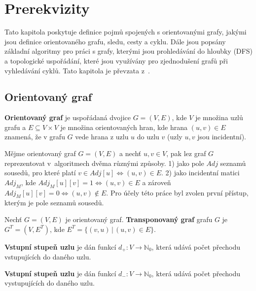 \chapter{Prerekvizity}
    \label{chapter:Intro}
    Tato kapitola poskytuje definice pojmů spojených s orientovanými grafy, jakými jsou definice orientovaného grafu, sledu, cesty a cyklu. Dále jsou popsány základní algoritmy pro práci s grafy, kterými jsou prohledávání do hloubky (DFS) a topologické uspořádání, které jsou využívány pro zjednodušení grafů při vyhledávání cyklů. Tato kapitola je převzata z~\cite{Prezentace}.

    \section{Orientovaný graf}
        \begin{definition}
            \textbf{Orientovaný graf} je uspořádaná dvojice $G = (V, E)$, kde $V$ je množina uzlů grafu a $E \subseteq V \times V$ je množina orientovaných hran, kde hrana $(u, v) \in E$ znamená, že v grafu $G$ vede hrana z uzlu $u$ do uzlu $v$ (uzly $u, v$ jsou incidentní).
        \end{definition}

        \vspace*{1em}
        Mějme orientovaný graf $G = (V, E)$ a nechť $u, v \in V$, pak lez graf $G$ reprezentovat v~algoritmech dvěma různými způsoby. 1) jako pole $Adj$ seznamů sousedů, pro které platí $v \in Adj[u] \iff (u, v) \in E$. 2) jako incidentní matici $Adj_M$, kde $Adj_M[u][v] = 1 \iff (u, v) \in E$ a zároveň  $Adj_M[u][v] = 0 \iff (u, v) \notin E$. Pro účely této práce byl zvolen první přístup, kterým je pole seznamů sousedů.

        \begin{definition}
            Nechť $G = (V, E)$ je orientovaný graf. \textbf{Transponovaný graf} grafu $G$ je $G^T = (V, E^T)$, kde $E^T = \{(v, u)\,|\, (u, v) \in E\}$.
        \end{definition}

        \begin{definition}
            \textbf{Vstupní stupeň uzlu} je dán funkcí $d_+ : V \rightarrow \mathbb{N}_0$, která udává počet přechodu vstupujících do daného uzlu.
        \end{definition}

        \begin{definition}
            \textbf{Vstupní stupeň uzlu} je dán funkcí $d_- : V \rightarrow \mathbb{N}_0$, která udává počet přechodu vystupujících do daného uzlu.
        \end{definition}

